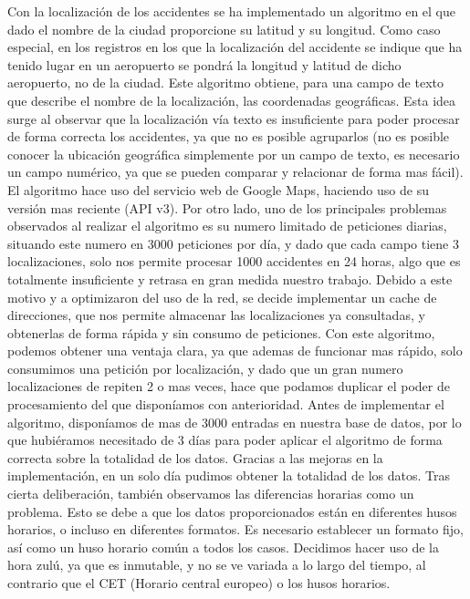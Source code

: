 \documentclass[a4paper,10pt]{article}
\begin{document}
	Con la localizaci\'on de los accidentes se ha implementado un algoritmo en el que dado el nombre de la ciudad proporcione su latitud y su longitud. Como caso especial, en los registros en los que la localizaci\'on del accidente se indique que ha tenido lugar en un aeropuerto se pondr\'a la longitud y latitud de dicho aeropuerto, no de la ciudad.
\singlespacing
Este algoritmo obtiene, para una campo de texto que  describe el nombre de la localizaci\'on, las coordenadas geogr\'aficas.
\singlespacing
Esta idea surge al observar que la localizaci\'on v\'ia texto es insuficiente para poder procesar de forma correcta los accidentes, ya que no es posible agruparlos (no es posible conocer la ubicaci\'on geogr\'afica simplemente por un campo de texto, es necesario un campo num\'erico, ya que se pueden comparar y relacionar de forma mas f\'acil). El algoritmo hace uso del servicio web de Google Maps, haciendo uso de su versi\'on mas reciente (API v3).
\singlespacing
Por otro lado, uno de los principales problemas observados al realizar el algoritmo es su numero limitado de peticiones diarias, situando este numero en 3000 peticiones por d\'ia, y dado que cada campo tiene 3 localizaciones, solo nos permite procesar 1000 accidentes en 24 horas, algo que es totalmente insuficiente y retrasa en gran medida nuestro trabajo. Debido a este motivo y a optimizaron del uso de la red, se decide implementar un cache de direcciones,  que nos permite almacenar las localizaciones ya consultadas, y obtenerlas de forma r\'apida y sin consumo de peticiones. Con este algoritmo, podemos obtener una ventaja clara, ya que ademas de funcionar mas r\'apido, solo consumimos una petici\'on por localizaci\'on, y dado que un gran numero localizaciones de repiten  2 o mas veces, hace que podamos duplicar el poder de procesamiento del que dispon\'iamos con anterioridad.
\singlespacing
\pagebreak
Antes de implementar el algoritmo, dispon\'iamos de mas de 3000 entradas en nuestra base de datos, por lo que hubi\'eramos necesitado de 3 d\'ias para poder aplicar el algoritmo de forma correcta sobre la totalidad de los datos. Gracias a las mejoras en la implementaci\'on, en un solo d\'ia pudimos obtener la totalidad de los datos.
\singlespacing
Tras cierta deliberaci\'on, tambi\'en observamos las diferencias horarias como un problema. Esto se debe a que los datos proporcionados est\'an en diferentes husos horarios, o incluso en diferentes formatos. Es necesario establecer un formato fijo, as\'i como un huso horario com\'un a todos los casos. Decidimos hacer uso de la hora zul\'u, ya que es inmutable, y no se ve variada a lo largo del tiempo, al contrario que el CET (Horario central europeo) o los husos horarios.
\end{document}
